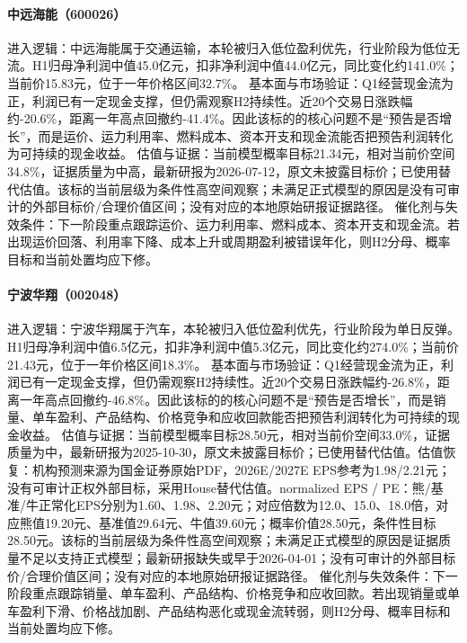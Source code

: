 \paragraph{中远海能（600026）}
进入逻辑：中远海能属于交通运输，本轮被归入低位盈利优先，行业阶段为低位无流。H1归母净利润中值45.0亿元，扣非净利润中值44.0亿元，同比变化约141.0\%；当前价15.83元，位于一年价格区间32.7\%。
基本面与市场验证：Q1经营现金流为正，利润已有一定现金支撑，但仍需观察H2持续性。近20个交易日涨跌幅约-20.6\%，距离一年高点回撤约-41.4\%。因此该标的的核心问题不是“预告是否增长”，而是运价、运力利用率、燃料成本、资本开支和现金流能否把预告利润转化为可持续的现金收益。
估值与证据：当前模型概率目标21.34元，相对当前价空间34.8\%，证据质量为中高，最新研报为2026-07-12，原文未披露目标价；已使用替代估值。该标的当前层级为条件性高空间观察；未满足正式模型的原因是没有可审计的外部目标价/合理价值区间；没有对应的本地原始研报证据路径。
催化剂与失效条件：下一阶段重点跟踪运价、运力利用率、燃料成本、资本开支和现金流。若出现运价回落、利用率下降、成本上升或周期盈利被错误年化，则H2分母、概率目标和当前处置均应下修。

\paragraph{宁波华翔（002048）}
进入逻辑：宁波华翔属于汽车，本轮被归入低位盈利优先，行业阶段为单日反弹。H1归母净利润中值6.5亿元，扣非净利润中值5.3亿元，同比变化约274.0\%；当前价21.43元，位于一年价格区间18.3\%。
基本面与市场验证：Q1经营现金流为正，利润已有一定现金支撑，但仍需观察H2持续性。近20个交易日涨跌幅约-26.8\%，距离一年高点回撤约-46.8\%。因此该标的的核心问题不是“预告是否增长”，而是销量、单车盈利、产品结构、价格竞争和应收回款能否把预告利润转化为可持续的现金收益。
估值与证据：当前模型概率目标28.50元，相对当前价空间33.0\%，证据质量为中，最新研报为2025-10-30，原文未披露目标价；已使用替代估值。估值恢复：机构预测来源为国金证券原始PDF，2026E/2027E EPS参考为1.98/2.21元；没有可审计正权外部目标，采用House替代估值。normalized EPS / PE：熊/基准/牛正常化EPS分别为1.60、1.98、2.20元；对应倍数为12.0、15.0、18.0倍，对应熊值19.20元、基准值29.64元、牛值39.60元；概率价值28.50元，条件性目标28.50元。该标的当前层级为条件性高空间观察；未满足正式模型的原因是证据质量不足以支持正式模型；最新研报缺失或早于2026-04-01；没有可审计的外部目标价/合理价值区间；没有对应的本地原始研报证据路径。
催化剂与失效条件：下一阶段重点跟踪销量、单车盈利、产品结构、价格竞争和应收回款。若出现销量或单车盈利下滑、价格战加剧、产品结构恶化或现金流转弱，则H2分母、概率目标和当前处置均应下修。

